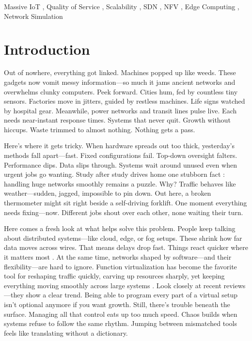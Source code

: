 \documentclass[a4paper,fleqn]{cas-dc}
\numberwithin{equation}{section}
\begin{document}
\begin{keywords}
Massive IoT \sep
Quality of Service \sep
Scalability \sep
SDN \sep
NFV \sep
Edge Computing \sep
Network Simulation
\end{keywords}

\maketitle


\section{Introduction}

Out of nowhere, everything got linked. Machines popped up like weeds. These gadgets now vomit messy information—so much it jams ancient networks and overwhelms clunky computers. Peek forward. Cities hum, fed by countless tiny sensors. Factories move in jitters, guided by restless machines. Life signs watched by hospital gear. Meanwhile, power networks and transit lines pulse live. Each needs near-instant response times. Systems that never quit. Growth without hiccups. Waste trimmed to almost nothing. Nothing gets a pass.

Here's where it gets tricky. When hardware spreads out too thick, yesterday's methods fall apart—fast. Fixed configurations fail. Top-down oversight falters. Performance dips. Data slips through. Systems wait around unused even when urgent jobs go wanting. Study after study drives home one stubborn fact \cite{Cheikh2025Energy,Sefati2024Resource,Kandil2024Scalability}: handling huge networks smoothly remains a puzzle. Why? Traffic behaves like weather—sudden, jagged, impossible to pin down. Out here, a broken thermometer might sit right beside a self-driving forklift. One moment everything needs fixing—now. Different jobs shout over each other, none waiting their turn.

Here comes a fresh look at what helps solve this problem. People keep talking about distributed systems—like cloud, edge, or fog setups. These shrink how far data moves across wires. That means delays drop fast. Things react quicker where it matters most \cite{Jeyaraj2023Resource,Shafiq2024Review}. At the same time, networks shaped by software—and their flexibility—are hard to ignore. Function virtualization has become the favorite tool for reshaping traffic quickly, carving up resources sharply, yet keeping everything moving smoothly across large systems \cite{Theodorou2023DENIS,Alam2025Comprehensive}. Look closely at recent reviews—they show a clear trend. Being able to program every part of a virtual setup isn't optional anymore if you want growth. Still, there's trouble beneath the surface. Managing all that control eats up too much speed. Chaos builds when systems refuse to follow the same rhythm. Jumping between mismatched tools feels like translating without a dictionary.
\end{document}
